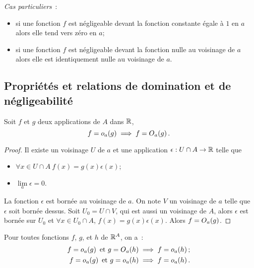 \emph{Cas particuliers}~:
\begin{itemize}
\item si une fonction $f$ est négligeable devant la fonction constante égale à $1$ en $a$ alors elle tend vers zéro en $a$;
\item si une fonction $f$ est négligeable devant la fonction nulle au voisinage de $a$ alors elle est identiquement nulle au voisinage de $a$.
\end{itemize}

\subsection{Propriétés et relations de domination et de négligeabilité}

\begin{prop}
  Soit $f$ et $g$ deux applications de $A$ dans $\mathbb{R}$,
  \begin{equation}
    f=o\mathopen{}_{a}\left(g\right) \implies f=O\mathopen{}_{a}\left(g\right).
  \end{equation}
\end{prop}
\begin{proof}
  Il existe un voisinage $U$ de $a$ et une application $\epsilon : U\cap A \rightarrow \mathbb{R}$ telle que 
\begin{itemize}
  \item $\forall x \in U \cap A \ f(x)=g(x)\epsilon(x)$;
  \item $\lim\limits_{a} \epsilon =0$.
  \end{itemize}
  La fonction $\epsilon$ est bornée au voisinage de $a$. On note $V$ un voisinage de $a$ telle que $\epsilon$ soit bornée dessus. Soit $U_0=U \cap V$, qui est aussi un voisinage de $A$, alors $\epsilon$ est bornée sur $U_0$ et $\forall x \in U_0 \cap A$,  $f(x)=g(x)\epsilon(x)$. Alors $f=O\mathopen{}_{a}\left(g\right)$.
\end{proof}
\begin{prop}[Transitivité]
  Pour toutes fonctions $f$, $g$, et $h$ de $\mathbb{R}^A$, on a~:
  \begin{align}
    f=o\mathopen{}_{a}\left(g\right) \text{~et~} g=O\mathopen{}_{a}\left(h\right) \implies f=o\mathopen{}_{a}\left(h\right);\\
    f=o\mathopen{}_{a}\left(g\right) \text{~et~} g=o\mathopen{}_{a}\left(h\right) \implies f=o\mathopen{}_{a}\left(h\right).
  \end{align}
\end{prop}

